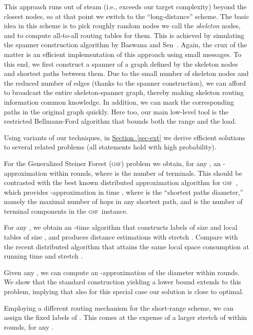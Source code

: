 \documentclass[letterpaper,11pt]{article}
\newcommand{\namedref}[2]{\hyperref[#2]{#1~\ref*{#2}}}
\newcommand{\sectionref}[1]{\namedref{Section}{#1}}
\newcommand{\gsf}{\textsc{gsf}}
\begin{document}
This approach runs out of steam (i.e., exceeds our target complexity)
beyond the closest  
nodes, so at that point we switch to the ``long-distance'' scheme. 
The basic idea in this scheme is to pick roughly  random
nodes we call the \emph{skeleton} nodes, and to
compute all-to-all routing tables for them. This is achieved by simulating the
spanner construction algorithm by Baswana and Sen~\cite{baswana07}.
Again, the crux of the matter is an efficient implementation of this approach
using small messages. To this end, we first construct a spanner of a
graph defined by the skeleton nodes and shortest paths between them. Due to the
small number of skeleton nodes and the reduced number of edges (thanks to the
spanner construction), we can afford to broadcast the entire skeleton-spanner
graph, thereby making skeleton routing information common knowledge. In addition, we
can mark the corresponding paths in the original graph quickly. Here too, our
main low-level tool is the restricted Bellmann-Ford algorithm
that bounds both the range and the load.

Using variants of our techniques, in \sectionref{sec-ext}
we derive efficient
solutions to several 
related problems (all statements hold with high probability).
\begin{compactitem}
\item For the Generalized Steiner Forest (\gsf) problem 
we obtain, for any , an
-approxima\-tion within
 rounds, where  is the number of
terminals. This should be contrasted with the best known distributed approximation
algorithm for \gsf\ \cite{KKMPT}, which provides -approximation in
time , where  is the ``shortest paths diameter,''
namely the maximal number of hops in any shortest path, and  is the number of
terminal components in the \gsf\ instance.
\item For any , we obtain an
  -time algorithm that
  constructs labels of size  and local tables of size
, and produces distance estimations with stretch
. Compare with the recent distributed algorithm \cite{DDP} that
attains the same local space consumption at running time  and stretch .
\item Given any , we can compute an
  -approximation of the diameter within
   rounds. We show that the standard
  construction yielding a lower bound  extends to
  this problem, implying that also for this special case our solution is close
  to optimal.
\item Employing a different routing mechanism for the short-range scheme, we can
assign the fixed labels of . This comes at the expense of a
larger stretch of  within
 rounds, for any .
\end{compactitem}
\end{document}

